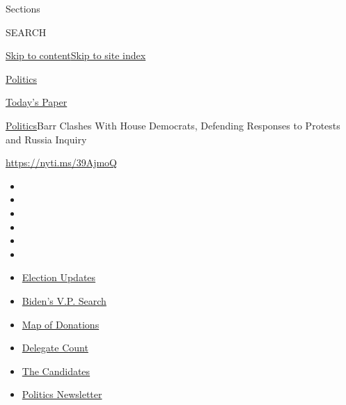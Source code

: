 Sections

SEARCH

\protect\hyperlink{site-content}{Skip to
content}\protect\hyperlink{site-index}{Skip to site index}

\href{https://www.nytimes.com/section/politics}{Politics}

\href{https://myaccount.nytimes.com/auth/login?response_type=cookie\&client_id=vi}{}

\href{https://www.nytimes.com/section/todayspaper}{Today's Paper}

\href{/section/politics}{Politics}\textbar{}Barr Clashes With House
Democrats, Defending Responses to Protests and Russia Inquiry

\url{https://nyti.ms/39AjmoQ}

\begin{itemize}
\item
\item
\item
\item
\item
\item
\end{itemize}

\begin{itemize}
\item
  \href{https://www.nytimes.com/2020/07/31/us/elections/biden-vs-trump.html?action=click\&pgtype=Article\&state=default\&region=TOP_BANNER\&context=storylines_menu}{Election
  Updates}
\item
  \href{https://www.nytimes.com/article/biden-vice-president-2020.html?action=click\&pgtype=Article\&state=default\&region=TOP_BANNER\&context=storylines_menu}{Biden's
  V.P. Search}
\item
  \href{https://www.nytimes.com/interactive/2020/07/24/us/politics/trump-biden-campaign-donors.html?action=click\&pgtype=Article\&state=default\&region=TOP_BANNER\&context=storylines_menu}{Map
  of Donations}
\item
  \href{https://www.nytimes.com/interactive/2020/us/elections/delegate-count-primary-results.html?action=click\&pgtype=Article\&state=default\&region=TOP_BANNER\&context=storylines_menu}{Delegate
  Count}
\item
  \href{https://www.nytimes.com/interactive/2019/us/politics/2020-presidential-candidates.html?action=click\&pgtype=Article\&state=default\&region=TOP_BANNER\&context=storylines_menu}{The
  Candidates}
\item
  \href{https://www.nytimes.com/newsletters/politics?action=click\&pgtype=Article\&state=default\&region=TOP_BANNER\&context=storylines_menu}{Politics
  Newsletter}
\end{itemize}


